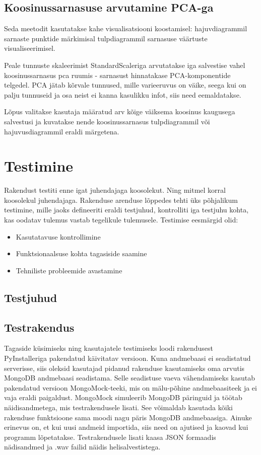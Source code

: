 \subsection{Koosinussarnasuse arvutamine PCA-ga}
Seda meetodit kasutatakse kahe visualisatsiooni koostamisel:
hajuvdiagrammil sarnaste punktide märkimisal
tulpdiagrammil sarnasuse väärtuste visualiseerimisel.

Peale tunnuste skaleerimist StandardScaleriga arvutatakse iga salvestise vahel koosinussarnasus pca ruumis - sarnasust hinnatakase PCA-komponentide telgedel. PCA jätab kõrvale tunnused, mille varieeruvus on väike, seega kui on palju tunnuseid ja osa neist ei kanna kasulikku infot, siis need eemaldatakse.

Lõpus valitakse kasutaja määratud arv kõige väiksema koosinus kaugusega salvestusi ja kuvatakse nende koosinussarnasus tulpdiagrammil või hajuvusdiagrammil eraldi märgetena.

\section{Testimine}
Rakendust testiti enne igat juhendajaga koosolekut. Ning mitmel korral koosolekul juhendajaga. Rakenduse arenduse lõppedes tehti üks põhjalikum testimine, mille jaoks defineeriti eraldi testjuhud, kontrolliti iga testjuhu kohta, kas oodatav tulemus vastab tegelikule tulemusele.
Testimise eesmärgid olid:
\begin{itemize}
    \item Kasutatavuse kontrollimine
    \item Funktsionaalsuse kohta tagasiside saamine
    \item Tehniliste probleemide avastamine
\end{itemize}

\subsection{Testjuhud}

\subsection{Testrakendus}
Tagaside küsimiseks ning kasutajatele testimiseks loodi rakendusest PyInstalleriga pakendatud käivitatav versioon. Kuna andmebaasi ei seadistatud serverisse, siis oleksid kasutajad pidanud rakenduse kasutamiseks oma arvutis MongoDB andmebaasi seadistama. Selle seadistuse vaeva vähendamiseks kasutab pakendatud versioon MongoMock-teeki, mis on mälu-põhine andmebaasiteek ja ei vaja eraldi paigaldust. MongoMock simuleerib MongoDB päringuid ja töötab näidisandmetega, mis testrakendusele lisati. See võimaldab kasutada kõiki rakenduse funktsioone sama moodi nagu päris MongoDB andmebaasiga. Ainuke erinevus on, et kui uusi andmeid importida, siis need on ajutised ja kaovad kui programm lõpetatakse. Testrakendusele lisati kaasa JSON formaadis nädisandmed ja .wav failid näidis helisalvestistega.


